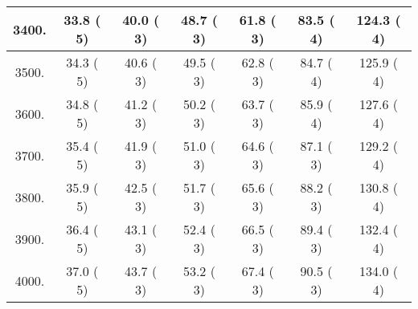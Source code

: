 \begin{tabular}{|c||c|c|c|c|c|c|}
\hline
 3400. &    33.8 (      5) &    40.0 (      3) &    48.7 (      3) &    61.8 (      3) &    83.5 (      4) &   124.3 (      4)\tabularnewline
\hline
 3500. &    34.3 (      5) &    40.6 (      3) &    49.5 (      3) &    62.8 (      3) &    84.7 (      4) &   125.9 (      4)\tabularnewline
\hline
 3600. &    34.8 (      5) &    41.2 (      3) &    50.2 (      3) &    63.7 (      3) &    85.9 (      4) &   127.6 (      4)\tabularnewline
\hline
 3700. &    35.4 (      5) &    41.9 (      3) &    51.0 (      3) &    64.6 (      3) &    87.1 (      3) &   129.2 (      4)\tabularnewline
\hline
 3800. &    35.9 (      5) &    42.5 (      3) &    51.7 (      3) &    65.6 (      3) &    88.2 (      3) &   130.8 (      4)\tabularnewline
\hline
 3900. &    36.4 (      5) &    43.1 (      3) &    52.4 (      3) &    66.5 (      3) &    89.4 (      3) &   132.4 (      4)\tabularnewline
\hline
 4000. &    37.0 (      5) &    43.7 (      3) &    53.2 (      3) &    67.4 (      3) &    90.5 (      3) &   134.0 (      4)\tabularnewline
\hline
\end{tabular}
